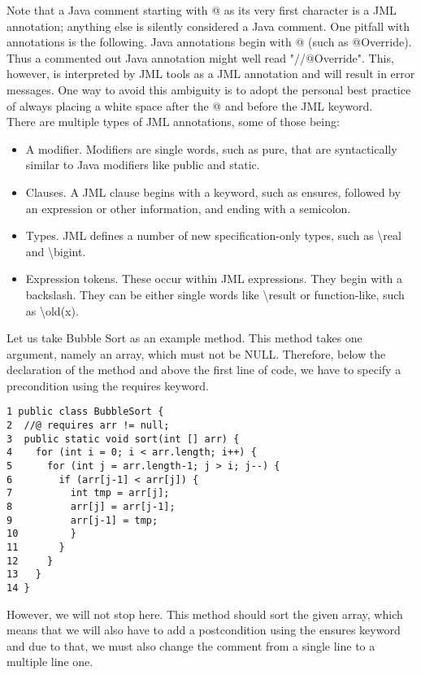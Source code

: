 \documentclass{article}
\begin{document}
Note that a Java comment starting with @ as its very first character is a JML annotation; anything else is silently considered a Java comment.
One pitfall with annotations is the following. Java annotations begin with @ (such as @Override).  Thus a commented out Java annotation might well read "//@Override". This, however, is interpreted by JML tools as a JML annotation and will result in error messages. One way to avoid this ambiguity is to adopt the personal best practice of always placing a white space after the @ and before the JML keyword.\\
There are multiple types of JML annotations, some of those being:\\
\begin{itemize}
    \item A modifier. Modifiers are single words, such as pure, that are syntactically similar to Java modifiers like public and static.
    \item Clauses. A JML clause begins with a keyword, such as ensures, followed by an expression or other information, and ending with a semicolon. 
    \item Types. JML defines a number of new specification-only types, such as \textbackslash real and \textbackslash bigint.
    \item Expression tokens. These occur within JML expressions. They begin with a backslash. They can be either single words like \textbackslash result or function-like, such as \textbackslash old(x).
\end{itemize}
Let us take Bubble Sort as an example method. This method takes one argument, namely an array, which must not be NULL. Therefore, below the declaration of the method and above the first line of code, we have to specify a precondition using the requires keyword.
\begin{lstlisting}[columns=fixed, basewidth=0.5em, basicstyle={\ttfamily}]
1 public class BubbleSort {    
2  //@ requires arr != null;
3  public static void sort(int [] arr) {        
4    for (int i = 0; i < arr.length; i++) {
5      for (int j = arr.length-1; j > i; j--) {
6        if (arr[j-1] < arr[j]) {
7          int tmp = arr[j];
8          arr[j] = arr[j-1];
9          arr[j-1] = tmp;
10         }
11       }
12     }
13   }
14 }
\end{lstlisting}
However, we will not stop here. This method should sort the given array, which means that we will also have to add a postcondition using the ensures keyword and due to that, we must also change the comment from a single line to a multiple line one. \pagebreak
\end{document}
